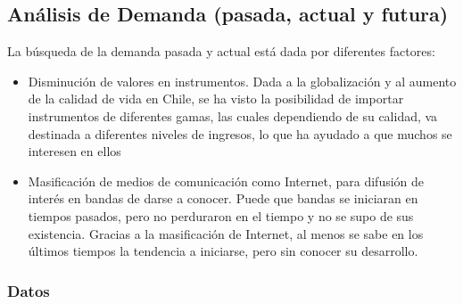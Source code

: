 \subsection{Análisis de Demanda (pasada, actual y futura)}

La búsqueda de la demanda pasada y actual está dada por diferentes factores:

\begin{itemize}
	\item Disminución de valores en instrumentos. Dada a la globalización y al aumento de la calidad de vida en Chile, se ha visto la posibilidad de importar instrumentos
de diferentes gamas, las cuales dependiendo de su calidad, va destinada a diferentes niveles de ingresos, lo que ha ayudado a que muchos se interesen en ellos 
	\item Masificación de medios de comunicación como Internet, para difusión de interés en bandas de darse a conocer. Puede que bandas se iniciaran en tiempos pasados, pero no perduraron en el tiempo y no se supo de sus existencia. Gracias a la masificación de Internet, al menos se sabe en los últimos tiempos la tendencia a iniciarse, pero sin conocer su desarrollo.
\end{itemize}

\subsubsection{Datos}

